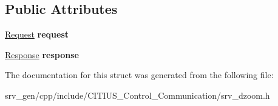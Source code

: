 \subsection*{\-Public \-Attributes}
\begin{DoxyCompactItemize}
\item 
\hypertarget{struct_c_i_t_i_u_s___control___communication_1_1srv__dzoom_a2f03e651d8555be7977bfeaffe197afe}{\hyperlink{struct_c_i_t_i_u_s___control___communication_1_1srv__dzoom_request__}{\-Request} {\bfseries request}}\label{struct_c_i_t_i_u_s___control___communication_1_1srv__dzoom_a2f03e651d8555be7977bfeaffe197afe}

\item 
\hypertarget{struct_c_i_t_i_u_s___control___communication_1_1srv__dzoom_a5251572094243f235b90d7d389909f2c}{\hyperlink{struct_c_i_t_i_u_s___control___communication_1_1srv__dzoom_response__}{\-Response} {\bfseries response}}\label{struct_c_i_t_i_u_s___control___communication_1_1srv__dzoom_a5251572094243f235b90d7d389909f2c}

\end{DoxyCompactItemize}


\-The documentation for this struct was generated from the following file\-:\begin{DoxyCompactItemize}
\item 
srv\-\_\-gen/cpp/include/\-C\-I\-T\-I\-U\-S\-\_\-\-Control\-\_\-\-Communication/srv\-\_\-dzoom.\-h\end{DoxyCompactItemize}
